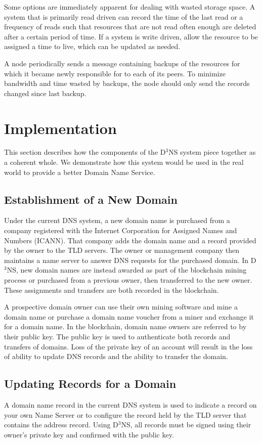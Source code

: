 Some options are immediately apparent for dealing with wasted storage space. A system that is primarily read driven can record the time of the last read or a frequency of reads such that resources that are not read often enough are deleted after a certain period of time. If a system is write driven, allow the resource to be assigned a time to live, which can be updated as needed.

A node periodically sends a message containing backups of the resources for which it became newly responsible for to each of its peers. To minimize bandwidth and time wasted by backups, the node should only send the records changed since last backup.



\section{Implementation}
This section describes how the components of the D$^3$NS system piece together as a coherent whole.  We demonstrate how this system would be used in the real world to provide a better Domain Name Service.


\subsection{Establishment of a New Domain}
Under the current DNS system, a new domain name is purchased from a company registered with the Internet Corporation for Assigned Names and Numbers (ICANN). That company adds the domain name and a record provided by the owner to the TLD servers. The owner or management company then maintains a name server to answer DNS requests for the purchased domain. In D$^{3}$NS, new domain names are instead awarded as part of the blockchain mining process or purchased from a previous owner, then transferred to the new owner. These assignments and transfers are both recorded in the blockchain. 

A prospective domain owner can use their own mining software and mine a domain name or purchase a domain name voucher from a miner and exchange it for a domain name. In the blockchain, domain name owners are referred to by their public key. The public key is used to authenticate both records and transfers of domains. Loss of the private key of an account will result in the loss of ability to update DNS records and the ability to transfer the domain. 


\subsection{Updating Records for a Domain}
A domain name record in the current DNS system is used to indicate a record on your own Name Server or to configure the record held by the TLD server that contains the address record. Using D$^3$NS, all records must be signed using their owner's private key and confirmed with the public key. 


